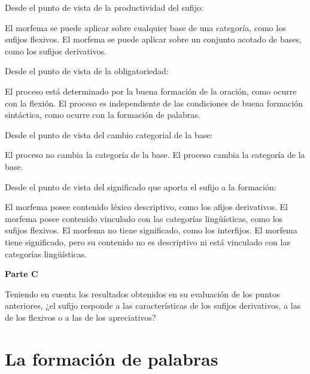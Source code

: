 \begin{ejercicio}
\begin{consignas}
  \item Desde el punto de vista de la productividad del sufijo:
        \begin{exe}
          \ex El morfema se puede aplicar sobre cualquier base de una categoría,
              como los sufijos flexivos.
          \ex El morfema se puede aplicar sobre un conjunto acotado de bases,
              como los sufijos derivativos.
        \end{exe}
  \item Desde el punto de vista de la obligatoriedad:
        \begin{exe}
          \ex El proceso está determinado por la buena formación de la oración,
              como ocurre con la flexión.
          \ex El proceso es independiente de las condiciones de buena formación
              sintáctica, como ocurre con la formación de palabras.
        \end{exe}
  \item Desde el punto de vista del cambio categorial de la base:
        \begin{exe}
          \ex El proceso no cambia la categoría de la base.
          \ex El proceso cambia la categoría de la base.
        \end{exe}
  \item Desde el punto de vista del significado que aporta el sufijo a la
        formación:
        \begin{exe}
          \ex El morfema posee contenido léxico descriptivo, como los afijos
              derivativos.
          \ex El morfema posee contenido vinculado con las categorías
              lingüísticas, como los sufijos flexivos.
          \ex El morfema no tiene significado, como los interfijos.
          \ex El morfema tiene significado, pero su contenido no es descriptivo
              ni está vinculado con las categorías lingüísticas.
        \end{exe}
\end{consignas}

\textbf{Parte C}

Teniendo en cuenta los resultados obtenidos en su evaluación de los puntos
anteriores, ¿el sufijo  responde a las características de los
sufijos derivativos, a las de los flexivos o a las de los apreciativos?
\end{ejercicio}

\section{La formación de palabras}


